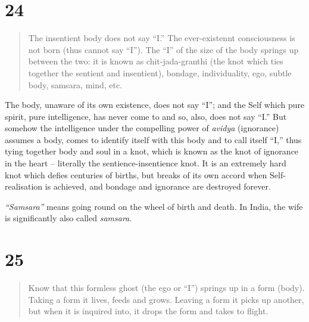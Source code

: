\documentclass[12pt]{report}
\begin{document}

\section{24}

\begin{quote}
  The insentient body does not say ``I.'' The ever-existennt
  consciousness is not born (thus cannot say ``I''). The ``I'' of the
  size of the body springs up between the two: it is known as
  chit-jada-granthi (the knot which ties together the sentient and
  insentient), bondage, individuality, ego, subtle body, samsara, mind,
  etc. 
\end{quote}

The body, unaware of its own existence, does not say ``I''; and the
Self which pure spirit, pure intelligence, has never come to and so,
also, does not say ``I.'' But somehow the intelligence under the
compelling power of \emph{avidya} (ignorance) assumes a body, comes to
identify itself with this body and to call itself ``I,'' thus tying
together body and soul in a knot, which is known as the knot of
ignorance in the heart -- literally the sentience-insentience knot. It
is an extremely hard knot which defies centuries of births, but breaks
of its own accord when Self-realisation is achieved, and bondage and
ignorance are destroyed forever.

\emph{``Samsara''} means going round on the wheel of birth and
death. In India, the wife is significantly also called
\emph{samsara}. 


\section{25}


\begin{quote}
  Know that this formless ghost (the ego or ``I'') springs up in a form
  (body). Taking a form it lives, feeds and grows. Leaving a form it
  picks up another, but when it is inquired into, it drops the form and
  takes to flight.
\end{quote}
\end{document}
